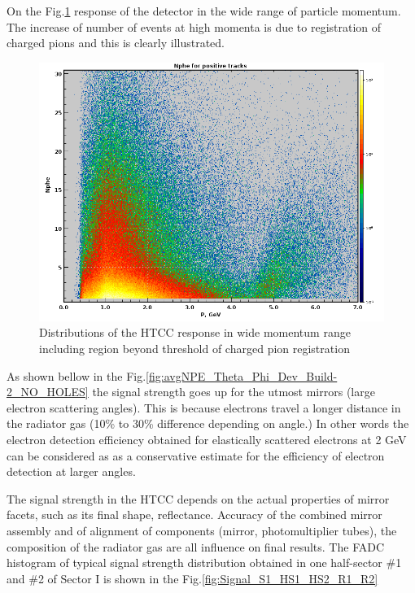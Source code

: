 On the Fig.\ref{fig:positivePNPEC6595} response of the detector in the wide range of particle momentum. The increase of number of events at high momenta is due to registration of charged pions and this is clearly illustrated.

\begin{figure}[!h]
    \centering
    \includegraphics[width=1.0\linewidth,trim={0.0cm 0.0cm 0.0cm 0.0cm},clip]{images/positivePNPEC6595.png}
    \caption{Distributions of the HTCC response in wide momentum range including region beyond threshold of charged pion registration}
    \label{fig:positivePNPEC6595}
\end{figure}
As shown bellow in the Fig.\ref{fig:avgNPE_Theta_Phi_Dev_Build-2_NO_HOLES} the signal strength goes up for the utmost mirrors (large electron scattering angles). This is because electrons travel a longer distance in the radiator gas (10\% to 30\% difference depending on angle.) In other words the electron detection efficiency obtained for elastically scattered electrons at 2 GeV can be considered as as a conservative estimate for the efficiency of electron detection at larger angles. 

\indent The signal strength in the HTCC depends on the actual properties of mirror facets, such as its final shape, reflectance. Accuracy of the combined mirror assembly and of alignment of components (mirror, photomultiplier tubes), the composition of the radiator gas are all influence on final results. The FADC histogram of  typical signal strength distribution obtained in one half-sector \#1 and \#2 of Sector I is shown in the Fig.\ref{fig:Signal_S1_HS1_HS2_R1_R2}


